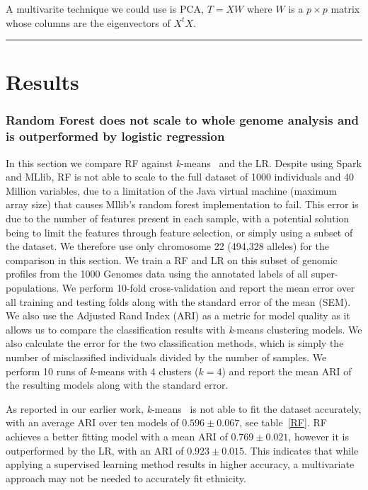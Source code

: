 \documentclass{llncs}
\newcommand{\kMeans}{\textit{k}-means }
\begin{document}
{A multivarite technique we could use is PCA, $T = X W$ where $W$ is a $p \times p$ matrix whose columns are the eigenvectors of $X^tX$. 
\hrule

\section{Results}

\subsubsection{Random Forest does not scale to whole genome analysis and is outperformed by logistic regression}
In this section we compare RF against \kMeans\ and the LR.  
Despite using {\sc Spark} and {\sc MLlib}, RF is not able to scale to the full dataset of 1000 individuals and 40
Million variables, due to a limitation of the Java virtual machine (maximum array size) that causes {\sc Mllib}'s
random forest implementation to fail. This error is due to the number of features present in each sample,
with a potential solution being to limit the features through feature selection, or simply using a subset of the dataset.
We therefore use only chromosome 22 (494,328 alleles) for the comparison in this section.  We train a RF
and LR on this subset of genomic profiles from the 1000 Genomes data using the annotated labels of all
super-populations.  We perform 10-fold cross-validation and report the mean error over all training and testing folds
along with the standard error of the mean (SEM). We also use the Adjusted Rand Index (ARI) as a metric for model quality
as it allows us to compare the classification results with \kMeans{} clustering models. We also calculate the error
for the two classification methods, which is simply the number of misclassified individuals divided by the number of samples.
We perform 10 runs of \kMeans{} with 4 clusters (\(k=4\)) and report the mean ARI of the
resulting models along with the standard error.

As reported in our earlier work, \kMeans\ is not able to fit the dataset accurately, with an average ARI over ten models of \(0.596 \pm 0.067\), see table~\ref{RF}.
RF achieves a better fitting model with a mean ARI of \(0.769 \pm 0.021\), however it is outperformed by the LR, with an ARI of \(0.923 \pm 0.015\).
This indicates that while applying a supervised learning method results in higher accuracy, a multivariate approach may not be needed to accurately fit ethnicity. 


}
\end{document}
